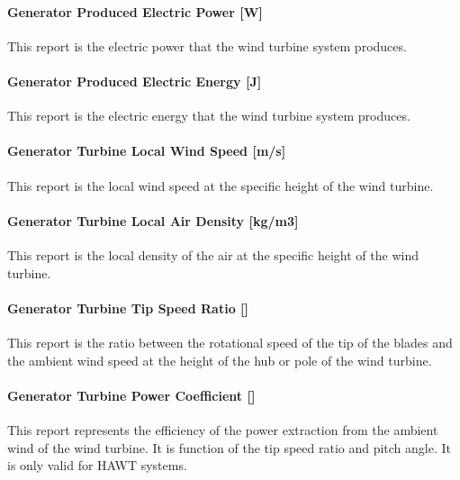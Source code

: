 \paragraph{Generator Produced Electric Power {[}W{]}}\label{generator-produced-electric-power-w-4}

This report is the electric power that the wind turbine system produces.

\paragraph{Generator Produced Electric Energy {[}J{]}}\label{generator-produced-electric-energy-j-4}

This report is the electric energy that the wind turbine system produces.

\paragraph{Generator Turbine Local Wind Speed {[}m/s{]}}\label{generator-turbine-local-wind-speed-ms}

This report is the local wind speed at the specific height of the wind turbine.

\paragraph{Generator Turbine Local Air Density {[}kg/m3{]}}\label{generator-turbine-local-air-density-kgm3}

This report is the local density of the air at the specific height of the wind turbine.

\paragraph{\texorpdfstring{Generator Turbine Tip Speed Ratio {[]}}{Generator Turbine Tip Speed Ratio }}\label{generator-turbine-tip-speed-ratio}

This report is the ratio between the rotational speed of the tip of the blades and the ambient wind speed at the height of the hub or pole of the wind turbine.

\paragraph{\texorpdfstring{Generator Turbine Power Coefficient {[]}}{Generator Turbine Power Coefficient }}\label{generator-turbine-power-coefficient}

This report represents the efficiency of the power extraction from the ambient wind of the wind turbine. It is function of the tip speed ratio and pitch angle. It is only valid for HAWT systems.

